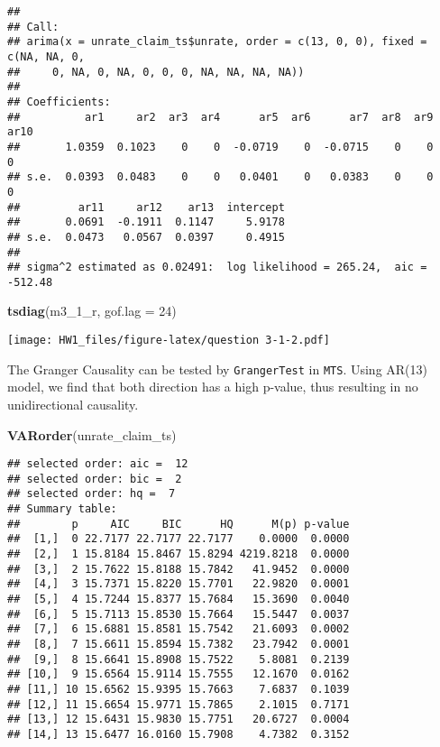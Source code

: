 \documentclass[]{article}
\newenvironment{Shaded}{\begin{snugshade}}{\end{snugshade}}
\newcommand{\KeywordTok}[1]{\textcolor[rgb]{0.13,0.29,0.53}{\textbf{#1}}}
\newcommand{\DataTypeTok}[1]{\textcolor[rgb]{0.13,0.29,0.53}{#1}}
\newcommand{\DecValTok}[1]{\textcolor[rgb]{0.00,0.00,0.81}{#1}}
\newcommand{\NormalTok}[1]{#1}
\begin{document}
\begin{verbatim}
## 
## Call:
## arima(x = unrate_claim_ts$unrate, order = c(13, 0, 0), fixed = c(NA, NA, 0, 
##     0, NA, 0, NA, 0, 0, 0, NA, NA, NA, NA))
## 
## Coefficients:
##          ar1     ar2  ar3  ar4      ar5  ar6      ar7  ar8  ar9  ar10
##       1.0359  0.1023    0    0  -0.0719    0  -0.0715    0    0     0
## s.e.  0.0393  0.0483    0    0   0.0401    0   0.0383    0    0     0
##         ar11     ar12    ar13  intercept
##       0.0691  -0.1911  0.1147     5.9178
## s.e.  0.0473   0.0567  0.0397     0.4915
## 
## sigma^2 estimated as 0.02491:  log likelihood = 265.24,  aic = -512.48
\end{verbatim}

\begin{Shaded}
\begin{Highlighting}[]
\KeywordTok{tsdiag}\NormalTok{(m3_1_r, }\DataTypeTok{gof.lag =} \DecValTok{24}\NormalTok{)}
\end{Highlighting}
\end{Shaded}

\texttt{[image: HW1\_files/figure-latex/question 3-1-2.pdf]}

The Granger Causality can be tested by \texttt{GrangerTest} in
\texttt{MTS}. Using AR(13) model, we find that both direction has a high
p-value, thus resulting in no unidirectional causality.

\begin{Shaded}
\begin{Highlighting}[]
\KeywordTok{VARorder}\NormalTok{(unrate_claim_ts)}
\end{Highlighting}
\end{Shaded}

\begin{verbatim}
## selected order: aic =  12 
## selected order: bic =  2 
## selected order: hq =  7 
## Summary table:  
##        p     AIC     BIC      HQ      M(p) p-value
##  [1,]  0 22.7177 22.7177 22.7177    0.0000  0.0000
##  [2,]  1 15.8184 15.8467 15.8294 4219.8218  0.0000
##  [3,]  2 15.7622 15.8188 15.7842   41.9452  0.0000
##  [4,]  3 15.7371 15.8220 15.7701   22.9820  0.0001
##  [5,]  4 15.7244 15.8377 15.7684   15.3690  0.0040
##  [6,]  5 15.7113 15.8530 15.7664   15.5447  0.0037
##  [7,]  6 15.6881 15.8581 15.7542   21.6093  0.0002
##  [8,]  7 15.6611 15.8594 15.7382   23.7942  0.0001
##  [9,]  8 15.6641 15.8908 15.7522    5.8081  0.2139
## [10,]  9 15.6564 15.9114 15.7555   12.1670  0.0162
## [11,] 10 15.6562 15.9395 15.7663    7.6837  0.1039
## [12,] 11 15.6654 15.9771 15.7865    2.1015  0.7171
## [13,] 12 15.6431 15.9830 15.7751   20.6727  0.0004
## [14,] 13 15.6477 16.0160 15.7908    4.7382  0.3152
\end{verbatim}
\end{document}
